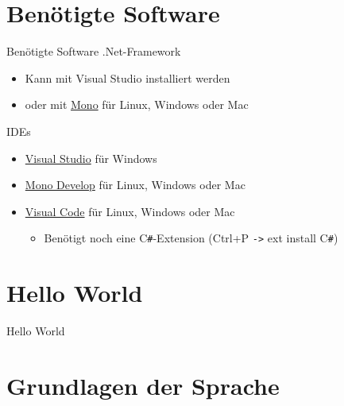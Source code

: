 \section{Benötigte Software}
\begin{frame}{Benötigte Software}
	.Net-Framework
	\begin{itemize}
		\item Kann mit Visual Studio installiert werden
		\item oder mit \href{http://www.mono-project.com/}{Mono} für Linux, Windows oder Mac
	\end{itemize}
	IDEs
	\begin{itemize}
		\item \href{https://www.visualstudio.com/}{Visual Studio} für Windows
		\item \href{http://www.monodevelop.com/}{Mono Develop} für Linux, Windows oder Mac
		\item \href{https://www.visualstudio.com/de-de/products/code-vs.aspx}{Visual Code} für Linux, Windows oder Mac
		\begin{itemize}
			\item Benötigt noch eine C\texttt{\#}-Extension (Ctrl+P \texttt{->} ext install C\texttt{\#})
		\end{itemize}
	\end{itemize}
\end{frame}


\section{Hello World}
\begin{frame}{Hello World}
    
\end{frame}

\section{Grundlagen der Sprache}
